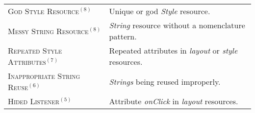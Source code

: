 \begin{table*}[htb!]
\begin{tabular}{@{}p{6.6cm}@{}p{10cm}@{}}
\textsc{God Style Resource}$^{(8)}$              & Unique or god \textit{Style} resource.   \\
\textsc{Messy String Resource}$^{(8)}$          & \textit{String} resource without a nomenclature pattern.   \\
\textsc{Repeated Style Attributes}$^{(7)}$        & Repeated attributes in \textit{layout} or \textit{style} resources.   \\
\textsc{Inappropriate String Reuse}$^{(6)}$           & \textit{Strings} being reused improperly.    \\
\textsc{Hided Listener}$^{(5)}$                   & Attribute \textit{onClick} in \textit{layout} resources.  \\
\bottomrule
\end{tabular}
\label{tab:Smells}
\end{table*}










